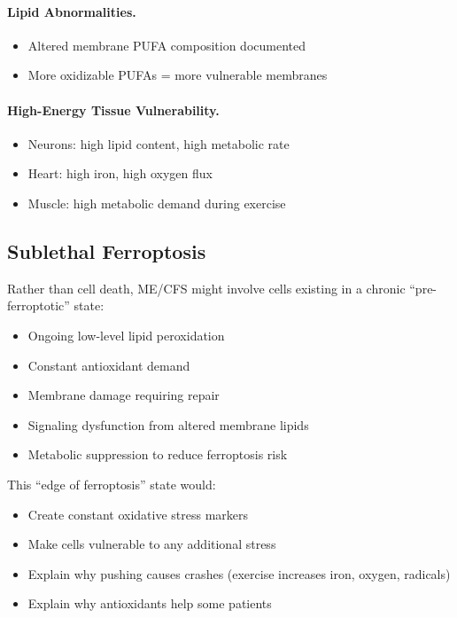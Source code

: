 \paragraph{Lipid Abnormalities.}
\begin{itemize}
    \item Altered membrane PUFA composition documented
    \item More oxidizable PUFAs = more vulnerable membranes
\end{itemize}

\paragraph{High-Energy Tissue Vulnerability.}
\begin{itemize}
    \item Neurons: high lipid content, high metabolic rate
    \item Heart: high iron, high oxygen flux
    \item Muscle: high metabolic demand during exercise
\end{itemize}

\subsection{Sublethal Ferroptosis}

Rather than cell death, ME/CFS might involve cells existing in a chronic ``pre-ferroptotic'' state:

\begin{itemize}
    \item Ongoing low-level lipid peroxidation
    \item Constant antioxidant demand
    \item Membrane damage requiring repair
    \item Signaling dysfunction from altered membrane lipids
    \item Metabolic suppression to reduce ferroptosis risk
\end{itemize}

This ``edge of ferroptosis'' state would:
\begin{itemize}
    \item Create constant oxidative stress markers
    \item Make cells vulnerable to any additional stress
    \item Explain why pushing causes crashes (exercise increases iron, oxygen, radicals)
    \item Explain why antioxidants help some patients
\end{itemize}

